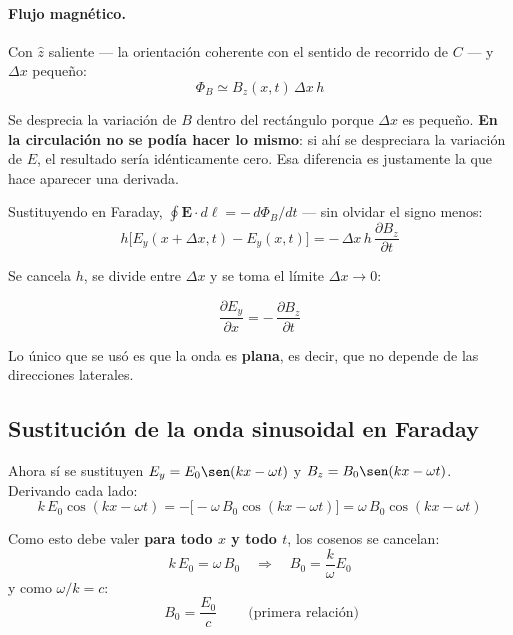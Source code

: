 \documentclass[12pt,a4paper]{article}
\begin{document}
\paragraph{Flujo magnético.}
Con $\hat{z}$ saliente --- la orientación coherente con el sentido de
recorrido de $C$ --- y $\Delta x$ pequeño:
\[
\Phi_B \simeq B_z(x,t)\,\Delta x\,h
\]

\begin{notebox}
Se desprecia la variación de $B$ dentro del rectángulo porque $\Delta x$ es
pequeño. \textbf{En la circulación no se podía hacer lo mismo}: si ahí se
despreciara la variación de $E$, el resultado sería idénticamente cero. Esa
diferencia es justamente la que hace aparecer una derivada.
\end{notebox}

Sustituyendo en Faraday,
$\oint \mathbf{E}\cdot d\boldsymbol{\ell} = -\,d\Phi_B/dt$ --- sin olvidar el
signo menos:
\[
h\big[E_y(x+\Delta x,t) - E_y(x,t)\big]
  = -\,\Delta x\,h\,\frac{\partial B_z}{\partial t}
\]

Se cancela $h$, se divide entre $\Delta x$ y se toma el límite
$\Delta x \to 0$:

\begin{keybox}
\[
\boxed{\ \frac{\partial E_y}{\partial x}
       = -\,\frac{\partial B_z}{\partial t}\ }
\]
\end{keybox}

\begin{notebox}
Lo único que se usó es que la onda es \textbf{plana}, es decir, que no
depende de las direcciones laterales.
\end{notebox}

\subsection{Sustitución de la onda sinusoidal en Faraday}

Ahora sí se sustituyen $E_y = E_0\sen(kx-\omega t)$ y
$B_z = B_0\sen(kx-\omega t)$. Derivando cada lado:
\[
k\,E_0\cos(kx-\omega t) = -\big[-\omega\,B_0\cos(kx-\omega t)\big]
                        = \omega\,B_0\cos(kx-\omega t)
\]

Como esto debe valer \textbf{para todo $x$ y todo $t$}, los cosenos se
cancelan:
\[
k\,E_0 = \omega\,B_0
\quad\Longrightarrow\quad
B_0 = \frac{k}{\omega}E_0
\]
y como $\omega/k = c$:
\[
\boxed{\ B_0 = \frac{E_0}{c}\ } \qquad \text{(primera relación)}
\]
\end{document}
